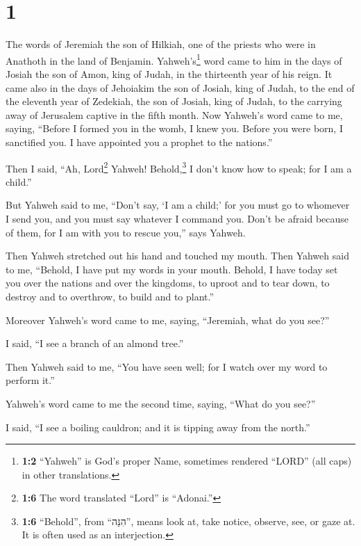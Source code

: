 \hypertarget{section}{%
\section{1}\label{section}}

 The words of Jeremiah the son of Hilkiah, one of the
priests who were in Anathoth in the land of Benjamin. 
Yahweh's\footnote{\textbf{1:2} ``Yahweh'' is God's proper Name,
  sometimes rendered ``LORD'' (all caps) in other translations.} word
came to him in the days of Josiah the son of Amon, king of Judah, in the
thirteenth year of his reign.  It came also in the days of
Jehoiakim the son of Josiah, king of Judah, to the end of the eleventh
year of Zedekiah, the son of Josiah, king of Judah, to the carrying away
of Jerusalem captive in the fifth month.  Now Yahweh's
word came to me, saying,  ``Before I formed you in the
womb, I knew you. Before you were born, I sanctified you. I have
appointed you a prophet to the nations.''

 Then I said, ``Ah, Lord\footnote{\textbf{1:6} The word
  translated ``Lord'' is ``Adonai.''} Yahweh! Behold,\footnote{\textbf{1:6}
  ``Behold'', from ``הִנֵּה'', means look at, take notice, observe, see,
  or gaze at. It is often used as an interjection.} I don't know how to
speak; for I am a child.''

 But Yahweh said to me, ``Don't say, `I am a child;' for
you must go to whomever I send you, and you must say whatever I command
you.  Don't be afraid because of them, for I am with you
to rescue you,'' says Yahweh.

 Then Yahweh stretched out his hand and touched my mouth.
Then Yahweh said to me, ``Behold, I have put my words in your mouth.
 Behold, I have today set you over the nations and over
the kingdoms, to uproot and to tear down, to destroy and to overthrow,
to build and to plant.''

 Moreover Yahweh's word came to me, saying, ``Jeremiah,
what do you see?''

I said, ``I see a branch of an almond tree.''

 Then Yahweh said to me, ``You have seen well; for I
watch over my word to perform it.''

 Yahweh's word came to me the second time, saying, ``What
do you see?''

I said, ``I see a boiling cauldron; and it is tipping away from the
north.''

